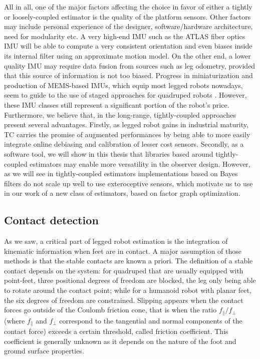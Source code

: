 All in all, one of the major factors affecting the choice in favor of either a tightly or loosely-coupled estimator is the quality of the platform sensors. Other factors may include personal experience of the designer, software/hardware architecture, need for modularity etc. 
A very high-end IMU such as the ATLAS fiber optics IMU will be able to compute a very consistent orientation and even biases inside its internal 
filter using an approximate motion model. On the other end, a lower quality IMU may require data fusion from sources such as leg odometry, 
provided that this source of information is not too biased. Progress in miniaturization and production of MEMS-based IMUs, which equip most 
legged robots nowadays, seem to guide to the use of staged approaches for quadruped robots \cite{bledt2018cheetah, leziart2021implementation}. 
However, these IMU classes still represent a significant portion of the robot's price. Furthermore, we believe that, in the long-range, tightly-coupled
approaches present several advantages. Firstly, as legged robot gains in industrial maturity, TC carries the promise of augmented performances by being able
to more easily integrate online debiasing and calibration of lesser cost sensors. Secondly, as a software tool, we will show in this thesis that libraries based
around tightly-coupled estimators may enable more versatility in the observer design. However, as we will see in  
tightly-coupled estimators implementations based on Bayes filters do not scale up well to use exteroceptive sensors, which motivate us to use in our work of a
new class of estimators, based on factor graph optimization.



\subsection{Contact detection}
As we saw, a critical part of legged robot estimation is the integration of kinematic information when feet are in contact. A major
assumption of those methods is that the stable contacts are known a priori. The definition of a stable contact depends on the system: for quadruped that 
are usually equipped with point-feet, three positional degrees of freedom are blocked, the leg only being able to rotate around the contact point; 
while for a humanoid robot with planar feet, the six degrees of freedom are constrained. Slipping appears when the contact forces go outside of the Coulomb friction cone, 
that is when the ratio $f_{\parallel}/f_{\perp}$ (where $f_{\parallel}$ and $f_{\perp}$ correspond to the tangential and normal components of the contact force) 
exceeds a certain threshold, called friction coefficient. 
This coefficient is generally unknown as it depends on the nature of the foot and ground surface properties.

